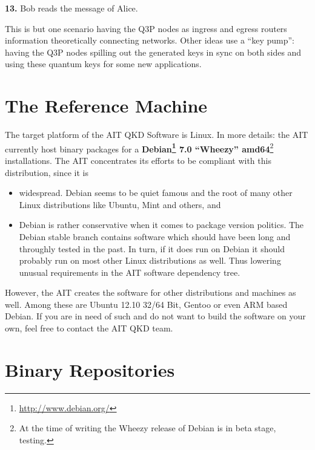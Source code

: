 \medskip

\textbf{13.} Bob reads the message of Alice.

\medskip

This is but one scenario having the Q3P nodes as ingress and egress routers information theoretically connecting networks. Other ideas use a ``key pump'': having the Q3P nodes spilling out the generated keys in sync on both sides and using these quantum keys for some new applications.

\section{The Reference Machine}
\label{sec:The Reference Machine}

The target platform of the AIT QKD Software is Linux. In more details: the AIT currently host binary packages for a \textbf{Debian\footnote{\url{http://www.debian.org/}} 7.0 ``Wheezy'' amd64}\footnote{At the time of writing the Wheezy release of Debian is in beta stage, testing.} installations. The AIT concentrates its efforts to be compliant with this distribution, since it is

\begin{itemize}

    \item widespread. Debian seems to be quiet famous and the root of many other Linux distributions like Ubuntu, Mint and others, and
    
    \item Debian is rather conservative when it comes to package version politics. The Debian stable branch contains software which should have been long and throughly tested in the past. In turn, if it does run on Debian it should probably run on most other Linux distributions as well. Thus lowering unusual requirements in the AIT software dependency tree.
    
\end{itemize}

However, the AIT creates the software for other distributions and machines as well. Among these are Ubuntu 12.10 32/64 Bit, Gentoo or even ARM based Debian. If you are in need of such and do not want to build the software on your own, feel free to contact the AIT QKD team.


\section{Binary Repositories}
\label{sec:Binary Repositories}

